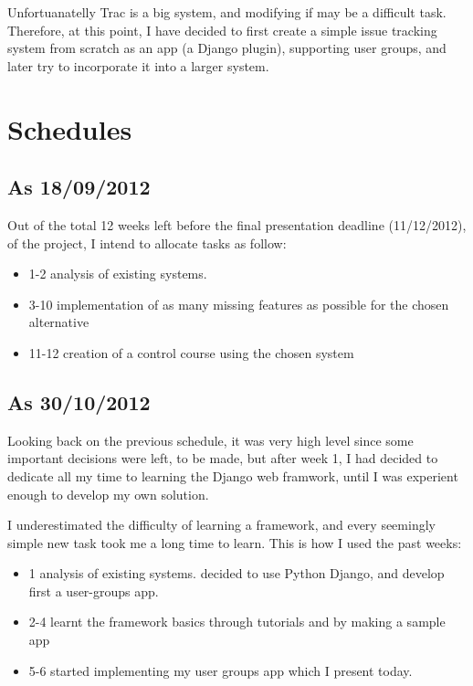 \documentclass[12pt]{article}
\begin{document}
Unfortuanatelly Trac is a big system, and modifying if may be a difficult task. Therefore, at this point, I have decided to first create a simple issue tracking system from scratch as an app (a Django plugin), supporting user groups, and later try to incorporate it into a larger system.

\section{Schedules}

\subsection{As 18/09/2012}

Out of the total 12 weeks left before the final presentation deadline (11/12/2012), of the project, I intend to allocate tasks as follow:

\begin{itemize}
  \item 1-2 analysis of existing systems.
  \item 3-10 implementation of as many missing features as possible for the chosen alternative
  \item 11-12 creation of a control course using the chosen system
\end{itemize}

\subsection{As 30/10/2012}

Looking back on the previous schedule, it was very high level since some important decisions were left,
to be made, but after week 1, I had decided to dedicate all my time to learning the Django web framwork,
until I was experient enough to develop my own solution.

I underestimated the difficulty of learning a framework, and every seemingly
simple new task took me a long time to learn. This is how I used the past weeks:

\begin{itemize}
  \item 1 analysis of existing systems. decided to use Python Django, and develop first a user-groups app.
  \item 2-4 learnt the framework basics through tutorials and by making a sample app
  \item 5-6 started implementing my user groups app which I present today.
\end{itemize}
\end{document}
